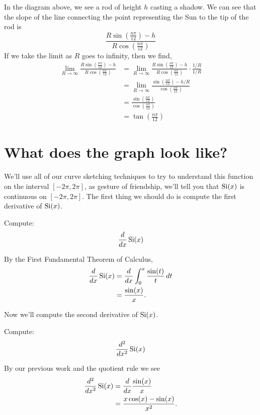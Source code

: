 \documentclass{ximera}
\begin{document}
In the diagram above, we see a rod of height $h$ casting a shadow. We
can see that the slope of the line connecting the point representing
the Sun to the tip of the rod is
\[
\frac{R\sin\left(\frac{n\pi}{12}\right)-h}{R\cos\left(\frac{n\pi}{12}\right)}
\]
If we take the limit as $R$ goes to infinity, then we find,
\begin{align*}
  \lim_{R\to \infty} \frac{R\sin\left(\frac{n\pi}{12}\right)-h}{R\cos\left(\frac{n\pi}{12}\right)} &=\lim_{R\to \infty}\frac{R\sin\left(\frac{n\pi}{12}\right)-h}{R\cos\left(\frac{n\pi}{12}\right)}\cdot\frac{1/R}{1/R}\\
  &= \lim_{R\to \infty}\frac{\sin\left(\frac{n\pi}{12}\right)-h/R}{\cos\left(\frac{n\pi}{12}\right)}\\
  &= \frac{\sin\left(\frac{n\pi}{12}\right)}{\cos\left(\frac{n\pi}{12}\right)}\\
  &= \tan\left(\frac{n\pi}{12}\right)
\end{align*}

\section{What does the graph look like?}

We'll use all of our curve sketching techniques to try to understand
this function on the interval $[-2\pi,2\pi]$, as gesture of
friendship, we'll tell you that $\si(x)$ is continuous on
$[-2\pi,2\pi]$.  The first thing we should do is compute the first
derivative of $\si(x)$.

\begin{example}
  Compute:
  \[
  \ddx \si(x)
  \]
  \begin{explanation}
    By the First Fundamental Theorem of Calculus,
    \begin{align*}
    \ddx \si(x) &= \ddx \int_0^x \frac{\sin(t)}{t}\d t\\
    &=\frac{\sin(x)}{x}.
    \end{align*}
  \end{explanation}
\end{example}

Now we'll compute the second derivative of $\si(x)$.

\begin{example}
  Compute:
  \[
  \dd[^2]{x^2}\si(x)
  \]
  \begin{explanation}
    By our previous work and the quotient rule we see
    \begin{align*}
      \dd[^2]{x^2} \si(x) &= \ddx \frac{\sin(x)}{x}\\
      &=\frac{x\cos(x) -\sin(x)}{x^2}.
    \end{align*}
  \end{explanation}
\end{example}
\end{document}

